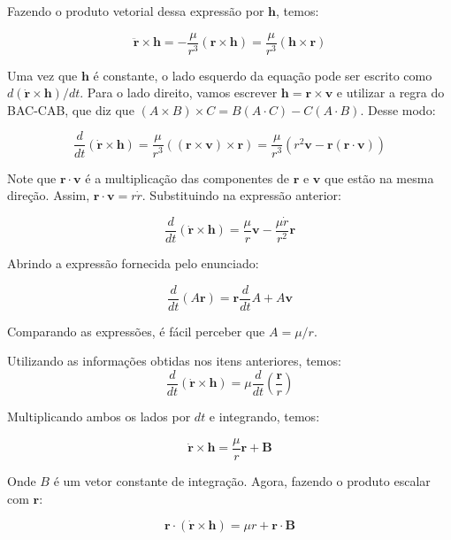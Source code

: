 \documentclass[11pt]{article}
\begin{document}
\begin{pproblem}
\begin{pssolution*}{}{}
\begin{alternativas}
            \item Fazendo o produto vetorial dessa expressão por \(\mathbf{h}\), temos:
            
            \[\ddot{\mathbf{r}}\times \mathbf{h} = -\frac{\mu}{r^3}(\mathbf{r}\times\mathbf{h}) = \frac{\mu}{r^3}(\mathbf{h}\times\mathbf{r})\]

            Uma vez que \(\mathbf{h}\) é constante, o lado esquerdo da equação pode ser escrito como \(d(\dot{\mathbf{r}}\times \mathbf{h})/dt\). Para o lado direito, vamos escrever \(\mathbf{h} = \mathbf{r}\times \mathbf{v}\) e utilizar a regra do BAC-CAB, que diz que \((A \times B) \times C = B(A\cdot C) - C(A \cdot B)\). Desse modo:

            \[\frac{d}{dt}(\dot{\mathbf{r}}\times \mathbf{h}) = \frac{\mu}{r^3}((\mathbf{r}\times\mathbf{v})\times \mathbf{r}) = \frac{\mu}{r^3}(r^2\mathbf{v} - \mathbf{r}(\mathbf{r}\cdot \mathbf{v}))\]

            Note que \(\mathbf{r}\cdot\mathbf{v}\) é a multiplicação das componentes de \(\mathbf{r}\) e \(\mathbf{v}\) que estão na mesma direção. Assim, \(\mathbf{r}\cdot\mathbf{v} = r\dot{r}\). Substituindo na expressão anterior:

            \[\boxed{\frac{d}{dt}(\dot{\mathbf{r}}\times \mathbf{h}) = \frac{\mu}{r}\mathbf{v} - \frac{\mu \dot{r}}{r^2}\mathbf{r}}\]

            \item Abrindo a expressão fornecida pelo enunciado:
            
            \[\frac{d}{dt}(A\mathbf{r}) = \mathbf{r}\frac{d}{dt}A + A \mathbf{v}\]

            Comparando as expressões, é fácil perceber que \(\boxed{A = \mu/r}\).

            \item Utilizando as informações obtidas nos itens anteriores, temos:
            \[\frac{d}{dt}(\dot{\mathbf{r}}\times \mathbf{h}) = \mu\frac{d}{dt}\left(\frac{\mathbf{r}}{r}\right)\]

            Multiplicando ambos os lados por \(dt\) e integrando, temos:

            \[\dot{\mathbf{r}}\times\mathbf{h} = \frac{\mu}{r}\mathbf{r} + \mathbf{B}\]

            Onde \(B\) é um vetor constante de integração. Agora, fazendo o produto escalar com \(\mathbf{r}\):

            \[\mathbf{r}\cdot(\dot{\mathbf{r}}\times \mathbf{h}) = \mu r + \mathbf{r}\cdot\mathbf{B}\]


\end{alternativas}
\end{pssolution*}
\end{pproblem}
\end{document}
